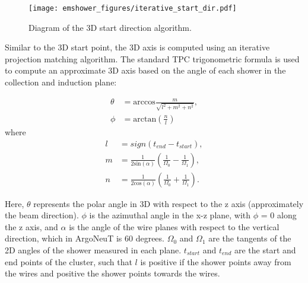 \begin{figure}[h!]
  \centering
  \texttt{[image: emshower\_figures/iterative\_start\_dir.pdf]}
  \caption[Diagram of the 3D start direction algorithm.]{Diagram of the 3D start direction algorithm.}
  \label{fig:iterative_start_dir}
\end{figure}


Similar to the 3D start point, the 3D axis is computed using an iterative projection matching algorithm.  The standard TPC trigonometric formula is used to compute an approximate 3D axis based on the angle of each shower in the collection and induction plane:

\begin{align}
  \theta &= \text{arccos}\frac{m}{\sqrt{l^2 + m^2 + n^2}}, \\
  \phi &= \text{arctan}\left(\frac{n}{l}\right) 
\end{align}
where
\begin{align}
l &= sign(t_{end} - t_{start}), \\
m &= \frac{1}{2 \text{sin}(\alpha)}\left(\frac{1}{\Omega_0} - \frac{1}{\Omega_1}\right), \\
n &= \frac{1}{2 \text{cos}(\alpha)}\left(\frac{1}{\Omega_0} + \frac{1}{\Omega_1}\right).
\end{align}

Here, $\theta$ represents the polar angle in 3D with respect to the z axis (approximately the beam direction).  $\phi$ is the azimuthal angle in the x-z plane, with $\phi$ = 0 along the z axis, and  $\alpha$ is the angle of the wire planes with respect to the vertical direction, which in ArgoNeuT is 60 degrees.  $\Omega_0$ and $\Omega_1$ are the tangents of the 2D angles of the shower measured in each plane.  $t_{start}$ and $t_{end}$ are the start and end points of the cluster, such that $l$ is positive if the shower points away from the wires and positive the shower points towards the wires.

